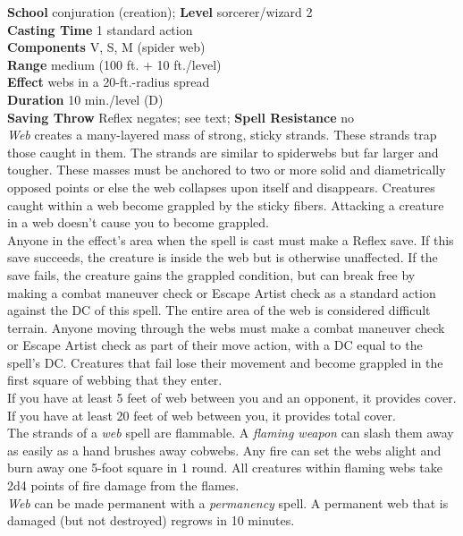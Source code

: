 \textbf{School }conjuration (creation); \textbf{Level }sorcerer/wizard 2\\
\textbf{Casting Time }1 standard action\\
\textbf{Components }V, S, M (spider web)\\
\textbf{Range }medium (100 ft. + 10 ft./level)\\
\textbf{Effect }webs in a 20-ft.-radius spread\\
\textbf{Duration }10 min./level (D)\\
\textbf{Saving Throw }Reflex negates; see text; \textbf{Spell Resistance }no\\
\textit{Web }creates a many-layered mass of strong, sticky strands. These strands trap those caught in them. The strands are similar to spiderwebs but far larger and tougher. These masses must be anchored to two or more solid and diametrically opposed points or else the web collapses upon itself and disappears. Creatures caught within a web become grappled by the sticky fibers. Attacking a creature in a web doesn't cause you to become grappled.\\
Anyone in the effect's area when the spell is cast must make a Reflex save. If this save succeeds, the creature is inside the web but is otherwise unaffected. If the save fails, the creature gains the grappled condition, but can break free by making a combat maneuver check or Escape Artist check as a standard action against the DC of this spell. The entire area of the web is considered difficult terrain. Anyone moving through the webs must make a combat maneuver check or Escape Artist check as part of their move action, with a DC equal to the spell's DC. Creatures that fail lose their movement and become grappled in the first square of webbing that they enter.\\
If you have at least 5 feet of web between you and an opponent, it provides cover. If you have at least 20 feet of web between you, it provides total cover.\\
The strands of a \textit{web }spell are flammable. A \textit{flaming weapon }can slash them away as easily as a hand brushes away cobwebs. Any fire can set the webs alight and burn away one 5-foot square in 1 round. All creatures within flaming webs take 2d4 points of fire damage from the flames.\\
\textit{Web }can be made permanent with a \textit{permanency }spell. A permanent web that is damaged (but not destroyed) regrows in 10 minutes.\\
